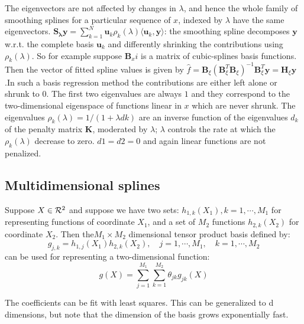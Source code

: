 \documentclass[12pt, letterpaper]{article}
\theoremstyle{definition}
\newcommand{\y}{\mathbf{y}}
\begin{document}
The eigenvectors are not affected by changes in $\lambda$, and hence the whole family of smoothing splines for a particular sequence of $x$, indexed by $\lambda$ have the same eigenvectors.
$\mathbf{S_\lambda} \y= \sum_{k=1}^N \mathbf{u}_k\rho_k(\lambda)\langle\mathbf{u}_k,\y\rangle$: the smoothing spline decomposes $\y$ w.r.t. the complete basis $\mathbf{u}_k$ and differently shrinking the contributions using $\rho_k(\lambda)$. 
So for example suppose $\mathbf{B}_xi$ is a matrix of cubic-splines basis functions. Then the vector of fitted spline values is given by $\hat{f} = \mathbf{B}_\xi (\mathbf{B}_\xi^T\mathbf{B}_\xi)^{-1} \mathbf{B}_\xi^T\y = \mathbf{H}_\xi \y$.In such a basis regression method the contributions are either left alone or shrunk to $0$. The first two eigenvalues are always $1$ and they correspond to the two-dimensional eigenspace of functions linear in $x$ which are never shrunk. The eigenvalues $\rho_k(\lambda) = 1/(1 + \lambda dk)$ are an inverse function of the eigenvalues $d_k$ of the penalty matrix $\mathbf{K}$, moderated by $\lambda$; $\lambda$ controls the rate at which the $\rho_k(\lambda)$ decrease to zero. $d1 = d2 = 0$ and again linear functions are not penalized.

\subsection{Multidimensional splines}
Suppose $X \in \CMcal{R}^2$ and suppose we have two sets: $h_{1,k}(X_1), k=1,\cdots, M_1$ for representing functions of coordinate $X_1$, and a set of $M_2$ functions $h_{2,k}(X_2)$ for coordinate $X_2$. Then the$M_1\times M_2$ dimensional tensor product basis defined by:
\begin{equation}
g_{j,k} = h_{1,j}(X_1)h_{2,k}(X_2), \quad j=1,\cdots, M_1, \quad k=1,\cdots, M_2 
\end{equation}
can be used for representing a two-dimensional function:
\begin{equation}
g(X) = \sum_{j=1}^{M_1}\sum_{k=1}^{M_2} \theta_{jk}g_{jk}(X)
\end{equation}

The coefficients can be fit with least squares. This can be generalized to d dimensions, but note that the dimension of the basis grows exponentially fast.
\end{document}
